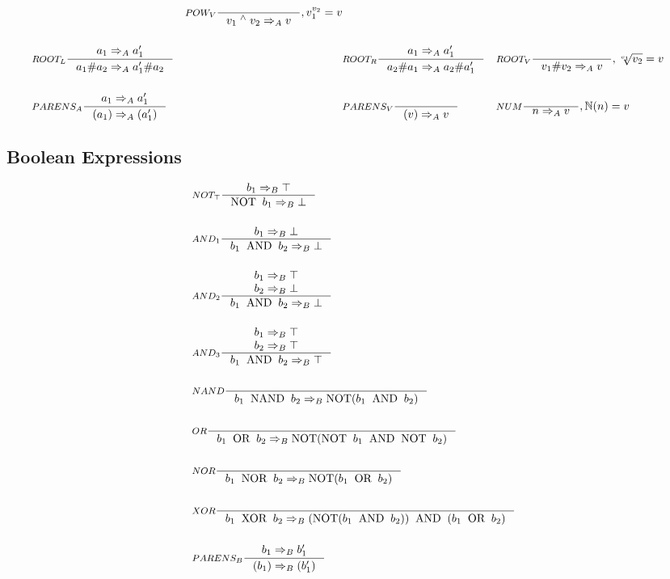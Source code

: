 \begin{align*}
&
&\inference[$POW_V$]{}
                    {v_1 \; ^\wedge{} \; v_2 \Rightarrow_A v}
										{, v_1 ^ {v_2} = v}
\\\\
&\inference[$ROOT_L$]{a_1  \Rightarrow_A a_1'}
                    {a_1 \# a_2 \Rightarrow_A a_1' \# a_2}
&
&\inference[$ROOT_R$]{a_1 \Rightarrow_A a_1'}
                    {a_2 \# a_1 \Rightarrow_A a_2 \# a_1'}
&
&\inference[$ROOT_V$]{}
                    {v_1 \# v_2 \Rightarrow_A v}
										{, \sqrt[v_1]{v_2} = v}
\\\\
&\inference[$PARENS_A$]{a_1 \Rightarrow_A a_1'}
                       {(a_1) \Rightarrow_A (a_1')}
&
&\inference[$PARENS_V$]{}
                       {(v) \Rightarrow_A v}
&
&\inference[$NUM$]{}
                  {n \Rightarrow_A v}
									{, \mathbb{N}(n) = v}
\end{align*}

\subsection{Boolean Expressions}
\begin{align*}
&\inference[$NOT_\top$]{b_1 \Rightarrow_B \top}
                       {\textrm{NOT} \;\; b_1 \Rightarrow_B \bot}
\\\\
&\inference[$AND_1$]{b_1 \Rightarrow_B \bot}
                    {b_1 \;\; \textrm{AND} \;\; b_2 \Rightarrow_B \bot}
\\\\
&\inference[$AND_2$]{b_1 \Rightarrow_B \top \\ b_2 \Rightarrow_B \bot}
								    {b_1 \;\; \textrm{AND} \;\; b_2 \Rightarrow_B \bot}
\\\\
&\inference[$AND_3$]{b_1 \Rightarrow_B \top \\ b_2 \Rightarrow_B \top}
								    {b_1 \;\; \textrm{AND} \;\; b_2 \Rightarrow_B \top}
\\\\
&\inference[$NAND$]{}
								   {b_1 \;\; \textrm{NAND} \;\; b_2 \Rightarrow_B \textrm{NOT} ( b_1 \;\; \textrm{AND} \;\; b_2 )}
\\\\
&\inference[$OR$]{}
                 {b_1 \;\; \textrm{OR} \;\; b_2 \Rightarrow_B \textrm{NOT}(\textrm{NOT} \;\; b_1 \;\; \textrm{AND} \;\; \textrm{NOT} \;\; b_2)}
\\\\
&\inference[$NOR$]{}
								   {b_1 \;\; \textrm{NOR} \;\; b_2 \Rightarrow_B \textrm{NOT} ( b_1 \;\; \textrm{OR} \;\; b_2 )}
\\\\
&\inference[$XOR$]{}
                  {b_1 \;\; \textrm{XOR} \;\; b_2 \Rightarrow_B (\textrm{NOT}(b_1 \;\; \textrm{AND} \;\; b_2)) \;\; \textrm{AND} \;\; (b_1 \;\; \textrm{OR} \;\; b_2)}
\\\\
&\inference[$PARENS_B$]{b_1 \Rightarrow_B b_1'}
                       {(b_1) \Rightarrow_B (b_1')}
\end{align*}

